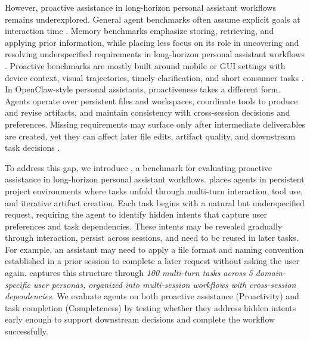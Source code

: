 However, proactive assistance in long-horizon personal assistant workflows remains underexplored. General agent benchmarks often assume explicit goals at interaction time \citep{liu2023agentbench,kim2026persona2web,zhang2026clawbench}. Memory benchmarks emphasize storing, retrieving, and applying prior information, while placing less focus on its role in uncovering and resolving underspecified requirements in long-horizon personal assistant workflows \citep{shen2026mem2actbench,liu2026memgui,he2026memoryarena}. Proactive benchmarks are mostly built around mobile or GUI settings with device context, visual trajectories, timely clarification, and short consumer tasks \citep{chen2026knowu,chai2026pira,nathani2026proactive}. In OpenClaw-style personal assistants, proactiveness takes a different form. Agents operate over persistent files and workspaces, coordinate tools to produce and revise artifacts, and maintain consistency with cross-session decisions and preferences. Missing requirements may surface only after intermediate deliverables are created, yet they can affect later file edits, artifact quality, and downstream task decisions \citep{vidgen2026apex,ji2026clawarena}.

To address this gap, we introduce \textbf{\bench}, a benchmark for evaluating proactive assistance in long-horizon personal assistant workflows. {\bench} places agents in persistent project environments where tasks unfold through multi-turn interaction, tool use, and iterative artifact creation. Each task begins with a natural but underspecified request, requiring the agent to identify hidden intents that capture user preferences and task dependencies. These intents may be revealed gradually through interaction, persist across sessions, and need to be reused in later tasks. For example, an assistant may need to apply a file format and naming convention established in a prior session to complete a later request without asking the user again. {\bench} captures this structure through \textit{100 multi-turn tasks across 5 domain-specific user personas, organized into multi-session workflows with cross-session dependencies}. We evaluate agents on both proactive assistance (Proactivity) and task completion (Completeness) by testing whether they address hidden intents early enough to support downstream decisions and complete the workflow successfully.

